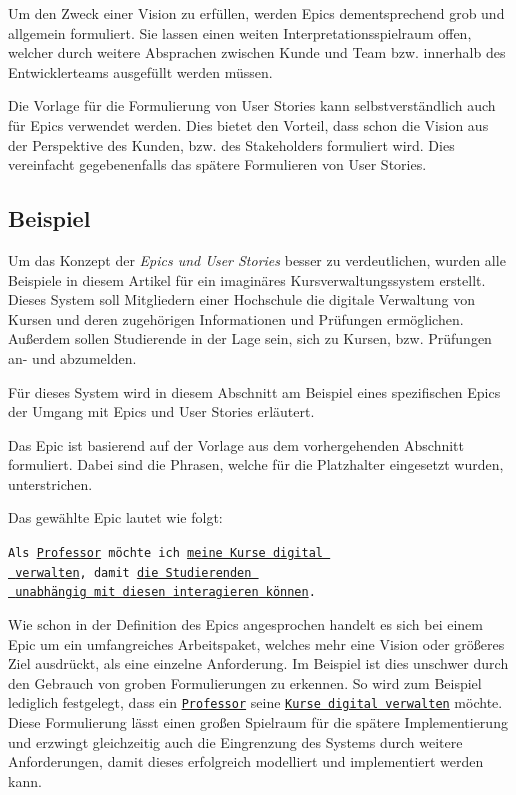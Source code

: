\documentclass[acmtog]{acmart}
\begin{document}
Um den Zweck einer Vision zu erfüllen, werden Epics dementsprechend grob und allgemein formuliert.
Sie lassen einen weiten Interpretationsspielraum offen, welcher durch weitere Absprachen zwischen
Kunde und Team bzw. innerhalb des Entwicklerteams ausgefüllt werden müssen.

Die Vorlage für die Formulierung von User Stories kann selbstverständlich auch für Epics verwendet werden.
Dies bietet den Vorteil, dass schon die Vision aus der Perspektive des Kunden, bzw. des Stakeholders formuliert
wird. Dies vereinfacht gegebenenfalls das spätere Formulieren von User Stories.

\subsection{Beispiel}
Um das Konzept der \emph{Epics und User Stories} besser zu verdeutlichen, wurden alle Beispiele in diesem
Artikel für ein imaginäres Kursverwaltungssystem erstellt.
Dieses System soll Mitgliedern einer Hochschule die digitale Verwaltung von Kursen und deren zugehörigen Informationen
und Prüfungen ermöglichen.
Außerdem sollen Studierende in der Lage sein, sich zu Kursen, bzw. Prüfungen an- und abzumelden.

Für dieses System wird in diesem Abschnitt am Beispiel eines spezifischen Epics der Umgang mit Epics und User Stories erläutert.

Das Epic ist basierend auf der Vorlage aus dem vorhergehenden Abschnitt formuliert.
Dabei sind die Phrasen, welche für die Platzhalter eingesetzt wurden, unterstrichen.

Das gewählte Epic lautet wie folgt:

\vspace{1em}
\texttt{Als \underline{Professor} möchte ich \underline{meine Kurse digital }\\
	\hspace*{3em}\underline{ verwalten}, damit \underline{die Studierenden }\\
	\hspace*{4em} \underline{ unabhängig mit diesen interagieren können}.}
\vspace{1em}

Wie schon in der Definition des Epics angesprochen handelt es sich bei einem Epic um ein umfangreiches
Arbeitspaket, welches mehr eine Vision oder größeres Ziel ausdrückt, als eine einzelne Anforderung.
Im Beispiel ist dies unschwer durch den Gebrauch von groben Formulierungen zu erkennen. So wird zum
Beispiel lediglich festgelegt, dass ein \underline{\texttt{Professor}} seine \underline{\texttt{Kurse digital verwalten}}
möchte. Diese Formulierung lässt einen großen Spielraum für die spätere Implementierung und erzwingt gleichzeitig
auch die Eingrenzung des Systems durch weitere Anforderungen, damit dieses erfolgreich modelliert und implementiert werden kann.
\end{document}
